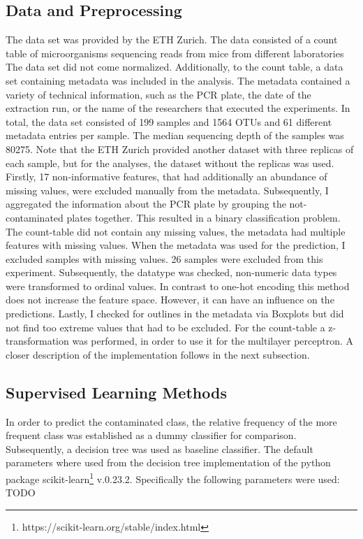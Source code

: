 \documentclass{svproc}
\begin{document}
\subsection{Data and Preprocessing}

The data set was provided by the ETH Zurich. The data consisted of a count table of microorganisms sequencing reads from mice from different laboratories The data set did not come normalized. Additionally, to the count table, a data set containing metadata was included in the analysis. The metadata contained a variety of technical information, such as the PCR plate, the date of the extraction run, or the name of the researchers that executed the experiments. In total, the data set consisted of 199 samples and 1564 OTUs and 61 different metadata entries per sample. The median sequencing depth of the samples was 80275. Note that the ETH Zurich provided another dataset with three replicas of each sample, but for the analyses, the dataset without the replicas was used.\\
Firstly, 17 non-informative features, that had additionally an abundance of missing values, were excluded manually from the metadata. Subsequently, I aggregated the information about the PCR plate by grouping the not-contaminated plates together. This resulted in a binary classification problem. The count-table did not contain any missing values, the metadata had multiple features with missing values. When the metadata was used for the prediction, I excluded samples with missing values. 26 samples were excluded from this experiment. Subsequently, the datatype was checked, non-numeric data types were transformed to ordinal values. In contrast to one-hot encoding this method does not increase the feature space. However, it can have an influence on the predictions. 
Lastly, I checked for outlines in the metadata via Boxplots but did not find too extreme values that had to be excluded. For the count-table a z-transformation was performed, in order to use it for the multilayer perceptron. A closer description of the implementation follows in the next subsection.

\subsection{Supervised Learning Methods}
In order to predict the contaminated class, the relative frequency of the more frequent class was established as a dummy classifier for comparison. Subsequently, a decision tree was used as baseline classifier. The default parameters where used from the decision tree implementation of the python package scikit-learn\footnote{https://scikit-learn.org/stable/index.html} v.0.23.2. Specifically the following parameters were used: TODO
\end{document}
